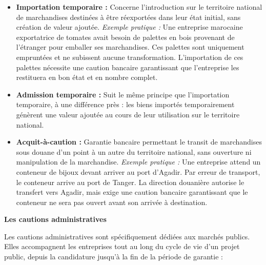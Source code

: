 \begin{itemize}
  \item \textbf{Importation temporaire :} Concerne l'introduction sur le territoire national de marchandises destinées à être réexportées dans leur état initial, sans création de valeur ajoutée. \textit{Exemple pratique :} Une entreprise marocaine exportatrice de tomates avait besoin de palettes en bois provenant de l'étranger pour emballer ses marchandises. Ces palettes sont uniquement empruntées et ne subissent aucune transformation. L'importation de ces palettes nécessite une caution bancaire garantissant que l'entreprise les restituera en bon état et en nombre complet.

  \item \textbf{Admission temporaire :} Suit le même principe que l'importation temporaire, à une différence près : les biens importés temporairement génèrent une valeur ajoutée au cours de leur utilisation sur le territoire national.

  \item \textbf{Acquit-à-caution :} Garantie bancaire permettant le transit de marchandises sous douane d'un point à un autre du territoire national, sans ouverture ni manipulation de la marchandise. \textit{Exemple pratique :} Une entreprise attend un conteneur de bijoux devant arriver au port d'Agadir. Par erreur de transport, le conteneur arrive au port de Tanger. La direction douanière autorise le transfert vers Agadir, mais exige une caution bancaire garantissant que le conteneur ne sera pas ouvert avant son arrivée à destination.
\end{itemize}

\medskip\textbf{Les cautions administratives}

Les cautions administratives sont spécifiquement dédiées aux marchés publics. Elles accompagnent les entreprises tout au long du cycle de vie d'un projet public, depuis la candidature jusqu'à la fin de la période de garantie :

